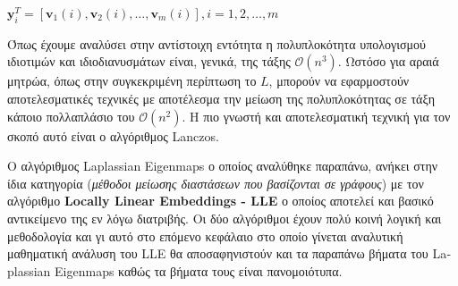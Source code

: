 $\mathbf{y}_{i}^{T} = [\mathbf{v}_{1}(i),\mathbf{v}_{2}(i),\ldots,\mathbf{v}_{m}(i)], i=1,2,\ldots,m$
\hspace*{\fill}\newline
\par
Όπως έχουμε αναλύσει στην αντίστοιχη εντότητα η πολυπλοκότητα υπολογισμού ιδιοτιμών και ιδιοδιανυσμάτων είναι, γενικά, της τάξης $\mathcal{O}(n^{3})$. Ωστόσο για αραιά μητρώα, όπως στην συγκεκριμένη περίπτωση το $L$, μπορούν να εφαρμοστούν αποτελεσματικές τεχνικές με αποτέλεσμα την μείωση της πολυπλοκότητας σε τάξη κάποιο πολλαπλάσιο του $\mathcal{O}(n^2)$. Η πιο γνωστή και αποτελεσματική τεχνική για τον σκοπό αυτό είναι ο αλγόριθμος \textlatin{Lanczos}\textlatin{\cite{lanczos}}.
\par
Ο αλγόριθμος \textlatin{Laplassian Eigenmaps} ο οποίος αναλύθηκε παραπάνω, ανήκει στην ίδια κατηγορία (\textit{μέθοδοι μείωσης διαστάσεων που βασίζονται σε γράφους}) με τον αλγόριθμο \textbf{\textlatin{Locally Linear Embeddings - LLE}} ο οποίος αποτελεί και βασικό αντικείμενο της εν λόγω διατριβής. Οι δύο αλγόριθμοι έχουν πολύ κοινή λογική και μεθοδολογία και γι αυτό στο επόμενο κεφάλαιο στο οποίο γίνεται αναλυτική μαθηματική ανάλυση του \textlatin{LLE} θα αποσαφηνιστούν και τα παραπάνω βήματα του \textlatin{Laplassian Eigenmaps} καθώς τα βήματα τους είναι πανομοιότυπα.

